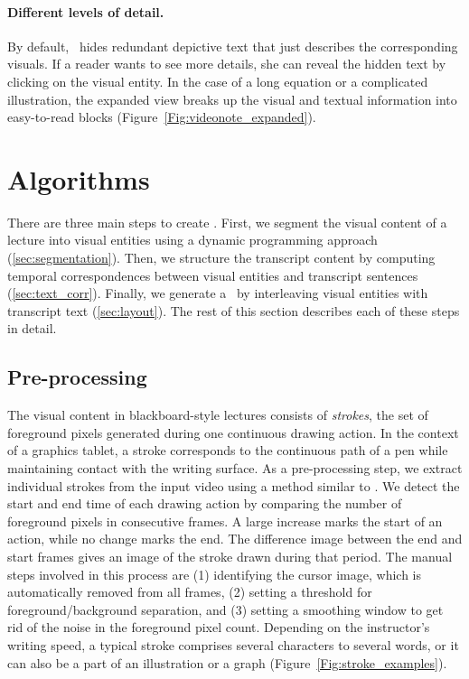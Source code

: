 \paragraph{Different levels of detail.} By default, \systemname\ hides redundant depictive text that just describes the corresponding visuals. If a reader wants to see more details, she can reveal the hidden text by clicking on the visual entity. In the case of a long equation or a complicated illustration, the expanded view breaks up the visual and textual information 
into easy-to-read blocks (Figure~\ref{Fig:videonote_expanded}). 

\section{Algorithms}
There are three main steps to create \systemname . First, we
segment the visual content of a lecture into visual entities using a
dynamic programming approach (\ref{sec:segmentation}). Then, we 
structure the transcript content by computing temporal correspondences
between visual entities and transcript sentences
(\ref{sec:text_corr}). Finally, we generate a \systemname\ by interleaving visual entities with transcript text (\ref{sec:layout}). The rest of this section describes each of these steps in detail.
%
\subsection{Pre-processing}
The visual content in blackboard-style lectures consists of \emph{strokes},
the set of foreground pixels generated during one continuous drawing action.
In the context of a graphics tablet, a stroke corresponds to the continuous
path of a pen while maintaining contact with the writing surface.  As a pre-processing step, we extract
individual strokes from the input video using a method similar to
\cite{monserrat2013notevideo}.  We detect the start and end time of
each drawing action by comparing the number of foreground pixels in
consecutive frames. A large increase marks the start of an action,
while no change marks the end. The difference image between the end
and start frames gives an image of the stroke drawn during that
period.
The manual steps involved in this process are (1) identifying the cursor image, which is automatically removed from all frames, (2) setting a threshold for foreground/background separation, and (3)  setting a smoothing window to get rid of the noise in the foreground pixel count. Depending on the instructor's writing speed, a typical stroke
comprises several characters to several words, or it can also be a
part of an illustration or a graph (Figure~\ref{Fig:stroke_examples}).\\

